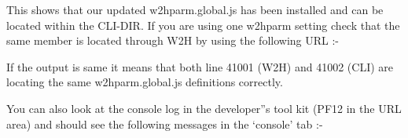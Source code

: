 \documentclass[letterpaper,10pt,english]{sphinxmanual}
\begin{document}
This shows that our updated w2hparm.global.js has been installed and can be located within the CLI-DIR. If you are using one w2hparm setting check that the same member is located through W2H by using the following URL :-

\begin{sphinxVerbatim}[commandchars=\\\{\}]
\end{sphinxVerbatim}

If the output is same it means that both line 41001 (W2H) and 41002 (CLI) are locating the same w2hparm.global.js definitions correctly.

You can also look at the console log in the developer”s tool kit (PF12 in the URL area) and should see the following messages in the ‘console’ tab :-
\end{document}
